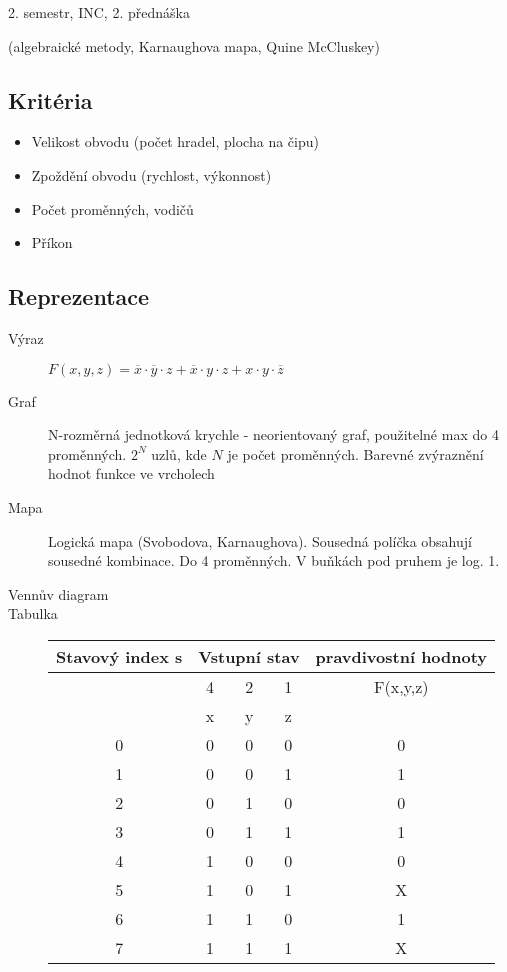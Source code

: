 \documentclass[a4paper, 11pt]{report}
\begin{document}
2. semestr, INC, 2. přednáška

(algebraické metody, Karnaughova mapa, Quine McCluskey)

\subsection{Kritéria}
\begin{itemize}
	\item Velikost obvodu (počet hradel, plocha na čipu)
	\item Zpoždění obvodu (rychlost, výkonnost)
	\item Počet proměnných, vodičů
	\item Příkon
\end{itemize}

\subsection{Reprezentace}

\begin{description}
	\item[Výraz] 
		$ F(x,y,z) = \overline{x} \cdot \overline{y} \cdot z + \overline{x} \cdot y \cdot z + x \cdot y \cdot \overline{z}$
	\item[Graf] N-rozměrná jednotková krychle - neorientovaný graf, použitelné max do 4 proměnných. $2^N$ uzlů, kde $N$ je počet proměnných. Barevné zvýraznění hodnot funkce ve vrcholech
	\item[Mapa] Logická mapa (Svobodova, Karnaughova). Sousedná políčka obsahují sousedné kombinace. Do 4 proměnných. V buňkách pod pruhem je log. 1.
	\item[Vennův diagram]
	\item[Tabulka]
		\begin{tabular}{| c | c | c | c | c | }
			\hline
			\multirow{3}{*}{Stavový index s}	& \multicolumn{3}{|c|}{Vstupní stav} & pravdivostní hodnoty \\ \hline
				& 4 & 2 & 1 & F(x,y,z) \\ \hline
				& x & y & z & 	\\ \hline
			0   & 0 & 0 & 0 & 0 \\ \hline
			1   & 0 & 0 & 1 & 1 \\ \hline
			2   & 0 & 1 & 0 & 0 \\ \hline
			3   & 0 & 1 & 1 & 1 \\ \hline
			4   & 1 & 0 & 0 & 0 \\ \hline
			5   & 1 & 0 & 1 & X \\ \hline
			6   & 1 & 1 & 0 & 1 \\ \hline
			7   & 1 & 1 & 1 & X \\ \hline
		\end{tabular}
		
\end{description}
\end{document}
